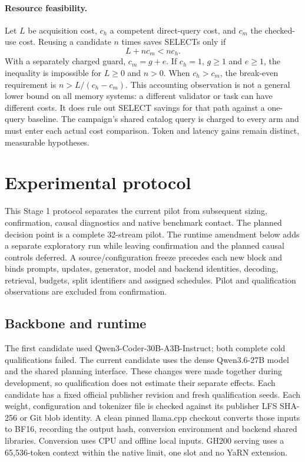 \documentclass[10pt,twocolumn]{article}
\begin{document}
\paragraph{Resource feasibility.}
Let $L$ be acquisition cost, $c_h$ a competent direct-query cost, and
$c_m$ the checked-use cost. Reusing a candidate
$n$ times saves SELECTs only if
\begin{equation}\label{eq:amortization}
 L+n c_m<n c_h.
\end{equation}
With a separately charged guard, $c_m=g+e$. If $c_h=1$, $g\geq1$ and $e\geq1$,
the inequality is impossible for $L\geq0$ and $n>0$.
When $c_h>c_m$, the break-even requirement is $n>L/(c_h-c_m)$. This accounting
observation is not a general lower bound on all memory systems: a different
validator or task can have different costs. It does rule out SELECT savings
for that path against a one-query baseline. The campaign's shared catalog query
is charged to every arm and must enter each actual cost comparison. Token and
latency gains remain distinct, measurable hypotheses.


\section{Experimental protocol}
This Stage 1 protocol separates the current pilot from subsequent sizing,
confirmation, causal diagnostics and native benchmark contact. The planned
decision point is a complete 32-stream pilot. The runtime amendment below adds
a separate exploratory run while leaving confirmation and the planned causal
controls deferred. A source/configuration freeze precedes each new block
and binds prompts, updates, generator, model and backend identities, decoding,
retrieval, budgets, split identifiers and assigned schedules. Pilot and
qualification observations are excluded from confirmation.

\subsection{Backbone and runtime}
The first candidate used Qwen3-Coder-30B-A3B-Instruct; both complete cold
qualifications failed. The current candidate uses the dense
Qwen3.6-27B model and the shared planning interface. These changes were made
together during development, so qualification does not estimate their separate
effects. Each candidate has a fixed official publisher revision and fresh
qualification seeds. Each weight, configuration and tokenizer file is checked
against its publisher LFS SHA-256 or Git blob identity. A clean
pinned llama.cpp checkout converts those inputs to BF16, recording the output
hash, conversion environment and backend shared libraries. Conversion uses CPU
and offline local inputs. GH200 serving uses a 65,536-token context within the
native limit, one slot and no YaRN extension.
\end{document}
